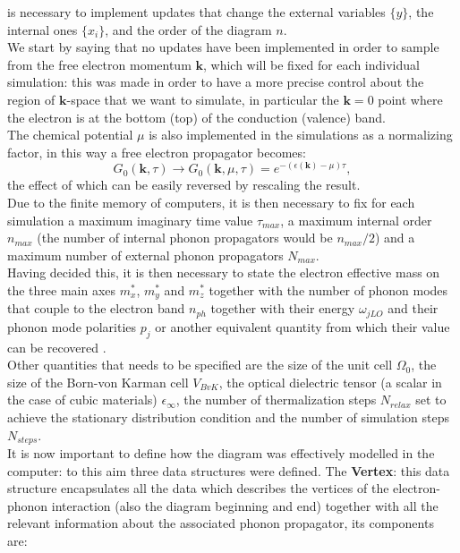 is necessary to implement updates that change the external variables $\{y\}$, the internal ones $\{x_i\}$, and the order of the diagram 
$n$.\\
We start by saying that no updates have been implemented in order to sample from the free electron momentum $\mathbf{k}$, which will be fixed 
for each individual simulation: this was made in order to have a more precise control about the region of $\mathbf{k}$-space that we want to simulate, in particular 
the $\mathbf{k}=0$ point where the electron is at the bottom (top) of the conduction (valence) band.\\
The chemical potential $\mu$ is also implemented in the simulations as a normalizing factor, in this way a free electron propagator 
becomes:
\begin{equation}
    G_0(\mathbf{k},\tau)\to G_0(\mathbf{k}, \mu, \tau)=e^{-(\epsilon(\mathbf{k})-\mu)\tau},
\end{equation}
the effect of which can be easily reversed by rescaling the result.\\
Due to the finite memory of computers, it is then necessary to fix for each simulation a maximum imaginary time value $\tau_{max}$, a maximum 
internal order $n_{max}$ (the number of internal phonon propagators would be $n_{max}/2$) and a maximum number of external phonon propagators $N_{max}$.\\
Having decided this, it is then necessary to state the electron effective mass on the three main axes $m^*_{x}$, $m^*_{y}$ and $m^*_{z}$ together with 
the number of phonon modes that couple to the electron band $n_{ph}$ together with their energy $\omega_{jLO}$ and their phonon mode polarities 
$p_j$ or another equivalent quantity from which their value can be recovered \cite{de2023high}.\\
Other quantities that needs to be specified are the size of the unit cell $\Omega_0$, the size of the Born-von Karman cell $V_{BvK}$, the optical 
dielectric tensor (a scalar in the case of cubic materials) $\epsilon_{\infty}$, the number of thermalization steps $N_{relax}$ set to achieve the 
stationary distribution condition and the number of simulation steps $N_{steps}$.\\
It is now important to define how the diagram was effectively modelled in the computer: to this aim three data structures were 
defined.
The \textbf{Vertex}: this data structure encapsulates all the data which describes the vertices of the electron-phonon interaction (also the diagram beginning and end)
together with all the relevant information about the associated phonon propagator, its components are:
